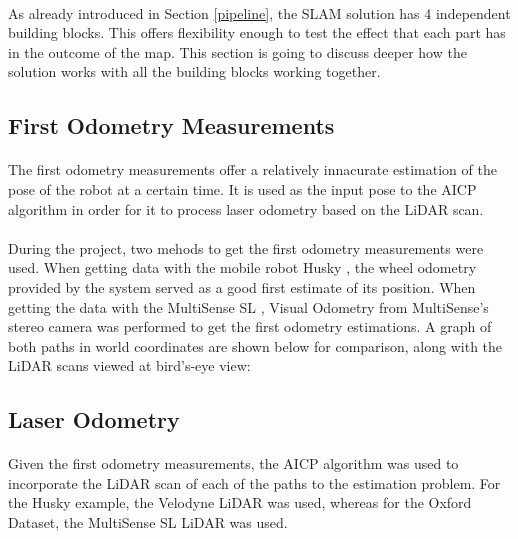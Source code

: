 \documentclass[11pt]{article}
\begin{document}
	\paragraph{}
	As already introduced in Section \ref{pipeline}, the SLAM solution has 4 independent building blocks. This offers flexibility enough to test the effect that each part has in the outcome of the map. This section is going to discuss deeper how the solution works with all the building blocks working together. 
	 
	\subsection{First Odometry Measurements}
	\paragraph{}
	The first odometry measurements offer a relatively innacurate estimation of the pose of the robot at a certain time. It is used as the input pose to the AICP algorithm in order for it to process laser odometry based on the LiDAR scan.
	
	\paragraph{}
	During the project, two mehods to get the first odometry measurements were used. When getting data with the mobile robot Husky \cite{Husky}, the wheel odometry provided by the system served as a good first estimate of its position. When getting the data with the MultiSense SL \cite{multisense}, Visual Odometry from MultiSense's stereo camera was performed to get the first odometry estimations. 
	A graph of both paths in world coordinates are shown below for comparison, along with the LiDAR scans viewed at bird's-eye view:
	
	\subsection{Laser Odometry}
	\paragraph{}
	Given the first odometry measurements, the AICP algorithm was used to incorporate the LiDAR scan of each of the paths to the estimation problem. For the Husky example, the Velodyne \cite{velodyne} LiDAR was used, whereas for the Oxford Dataset, the MultiSense SL LiDAR was used.
	
\end{document}
